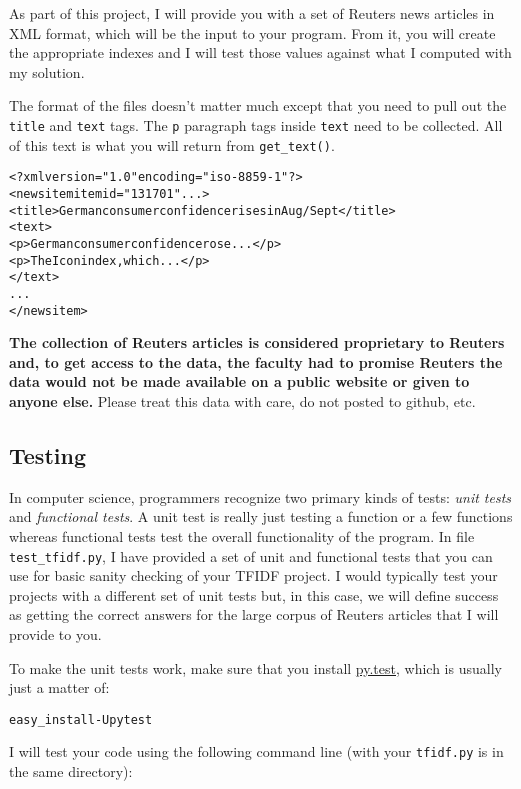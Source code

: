\begin{fullwidth}
As part of this project, I will provide you with a set of Reuters news articles in XML format, which will be the input to your program. From it, you will create the appropriate indexes and I will test those values against what I computed with my solution.

The format of the files doesn't matter much except that you need to pull out the {\tt title} and {\tt text} tags. The {\tt p} paragraph tags inside {\tt text} need to be collected. All of this text is what you will return from {\tt get\_text()}.
 
\begin{alltt}
<?xml version="1.0" encoding="iso-8859-1" ?>
<newsitem itemid="131701" ...>
<title>German consumer confidence rises in Aug/Sept</title>
<text>
<p>German consumer confidence rose...</p>
<p>The Icon index, which...</p>
</text>
...
</newsitem>
\end{alltt}

{\bf The collection of Reuters articles is considered proprietary to Reuters and, to get access to the data, the faculty had to promise Reuters the data would not be made available on a public website or given to anyone else.} Please treat this data with care, do not posted to github, etc.

\subsection{Testing}

In computer science, programmers recognize two primary kinds of tests: {\em unit tests} and {\em functional tests}. A unit test is really just testing a function or a few functions whereas functional tests test the overall functionality of the program. In file {\tt test\_tfidf.py}, I have provided a set of unit and functional tests that you can use for basic sanity checking of your TFIDF project.  I would typically test your projects with a different set of unit tests but, in this case, we will define success as getting the correct answers for the large corpus of Reuters articles that I will provide to you.

To make the unit tests work, make sure that you install \href{http://pytest.org/latest/getting-started.html}{py.test}, which is usually just a matter of:

\begin{alltt}
easy_install -U pytest
\end{alltt}

I will test your code using the following command line (with your {\tt tfidf.py} is in the same directory):


\end{fullwidth}
